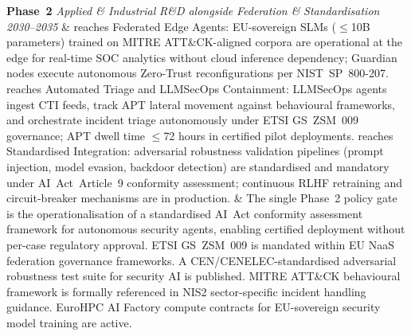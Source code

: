 \begin{landscape}
\begin{longtable}
\textbf{Phase~2}
\newline\textit{Applied \& Industrial}
\newline\textit{R\&D alongside}
\newline\textit{Federation \&}
\newline\textit{Standardisation}
\newline\textit{2030--2035}
\newline{}
\newline{}
&
 reaches Federated Edge Agents: EU-sovereign SLMs ($\leq$10B
parameters) trained on MITRE ATT\&CK-aligned corpora are operational
at the edge for real-time SOC analytics without cloud inference
dependency; Guardian nodes execute autonomous Zero-Trust
reconfigurations per NIST~SP~800-207.  reaches Automated
Triage and LLMSecOps Containment: LLMSecOps agents ingest CTI feeds,
track APT lateral movement against behavioural frameworks, and
orchestrate incident triage autonomously under ETSI GS~ZSM~009
governance; APT dwell time $\leq$72 hours in certified pilot deployments.
 reaches Standardised Integration: adversarial robustness
validation pipelines (prompt injection, model evasion, backdoor
detection) are standardised and mandatory under AI~Act~Article~9
conformity assessment; continuous RLHF retraining and circuit-breaker
mechanisms are in production.
&
The single Phase~2 policy gate is the operationalisation of a
standardised AI~Act conformity assessment framework for autonomous
security agents, enabling certified deployment without per-case
regulatory approval. ETSI GS~ZSM~009 is mandated within EU NaaS
federation governance frameworks. A CEN/CENELEC-standardised adversarial
robustness test suite for security AI is published. MITRE ATT\&CK
behavioural framework is formally referenced in NIS2 sector-specific
incident handling guidance. EuroHPC AI Factory compute contracts for
EU-sovereign security model training are active.
\end{longtable}
\end{landscape}

